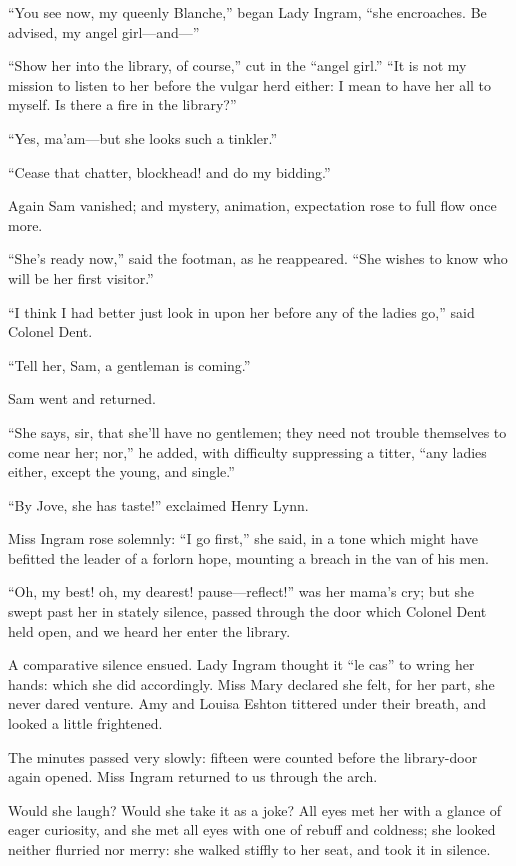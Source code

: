 \enquote{You see now, my queenly Blanche,} began Lady Ingram,
\enquote{she encroaches. Be advised, my angel girl---and---}

\enquote{Show her into the library, of course,} cut in the
\enquote{angel girl.} \enquote{It is not my mission to listen to her
	before the vulgar herd either: I mean to have her all to myself. Is
	there a fire in the library?}

\enquote{Yes, ma'am---but she looks such a tinkler.}

\enquote{Cease that chatter, blockhead! and do my bidding.}

Again Sam vanished; and mystery, animation, expectation rose to full
flow once more.

\enquote{She's ready now,} said the footman, as he reappeared.
\enquote{She wishes to know who will be her first visitor.}

\enquote{I think I had better just look in upon her before any of the
	ladies go,} said Colonel Dent.

\enquote{Tell her, Sam, a gentleman is coming.}

Sam went and returned.

\enquote{She says, sir, that she'll have no gentlemen; they need not
	trouble themselves to come near her; nor,} he added, with difficulty
suppressing a titter, \enquote{any ladies either, except the young, and
	single.}

\enquote{By Jove, she has taste!} exclaimed Henry Lynn.

Miss Ingram rose solemnly: \enquote{I go first,} she said, in a tone
which might have befitted the leader of a forlorn hope, mounting a
breach in the van of his men.

\enquote{Oh, my best! oh, my dearest! pause---reflect!} was her mama's
cry; but she swept past her in stately silence, passed through the door
which Colonel Dent held open, and we heard her enter the library.

A comparative silence ensued. Lady Ingram thought it \enquote{le cas}
to wring her hands: which she did accordingly. Miss Mary declared she
felt, for her part, she never dared venture. Amy and Louisa Eshton
tittered under their breath, and looked a little frightened.

The minutes passed very slowly: fifteen were counted before the
library-door again opened. Miss Ingram returned to us through the arch.

Would she laugh? Would she take it as a joke? All eyes met her with a
glance of eager curiosity, and she met all eyes with one of rebuff and
coldness; she looked neither flurried nor merry: she walked stiffly to
her seat, and took it in silence.

